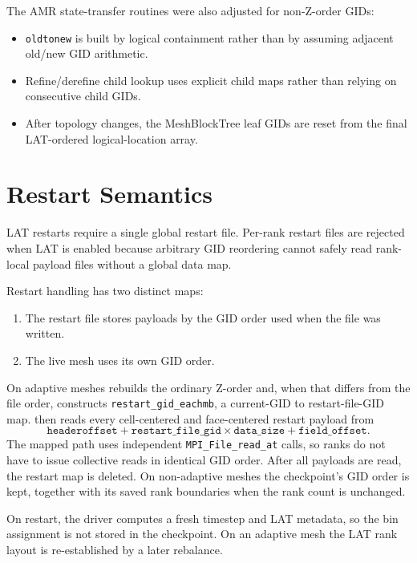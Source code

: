 \documentclass[11pt]{article}
\begin{document}
The AMR state-transfer routines were also adjusted for non-Z-order GIDs:
\begin{itemize}
  \item \texttt{oldtonew} is built by logical containment rather than by
        assuming adjacent old/new GID arithmetic.
  \item Refine/derefine child lookup uses explicit child maps rather than
        relying on consecutive child GIDs.
  \item After topology changes, the MeshBlockTree leaf GIDs are reset from the
        final LAT-ordered logical-location array.
\end{itemize}

\section{Restart Semantics}

LAT restarts require a single global restart file.  Per-rank restart files are
rejected when LAT is enabled because arbitrary GID reordering cannot safely
read rank-local payload files without a global data map.

Restart handling has two distinct maps:
\begin{enumerate}
  \item The restart file stores payloads by the GID order used when the file
        was written.
  \item The live mesh uses its own GID order.
\end{enumerate}
On adaptive meshes  rebuilds the ordinary Z-order
and, when that differs from the file order, constructs
\texttt{restart\_gid\_eachmb}, a current-GID to restart-file-GID map.
 then reads every cell-centered and
face-centered restart payload from
\[
  \texttt{headeroffset}
  + \texttt{restart\_file\_gid}\times\texttt{data\_size}
  + \texttt{field\_offset}.
\]
The mapped path uses independent \texttt{MPI\_File\_read\_at} calls, so ranks
do not have to issue collective reads in identical GID order.  After all
payloads are read, the restart map is deleted.  On non-adaptive meshes the
checkpoint's GID order is kept, together with its saved rank boundaries when
the rank count is unchanged.

On restart, the driver computes a fresh timestep and LAT metadata, so the bin
assignment is not stored in the checkpoint.  On an adaptive mesh the LAT rank
layout is re-established by a later rebalance.
\end{document}
